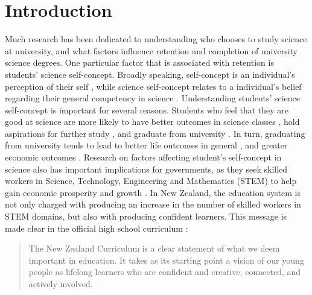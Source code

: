 \section{Introduction}
\label{intro}
Much research has been dedicated to understanding who chooses to study science at university, and what factors influence retention and completion of university science degrees. One particular factor that is associated with retention is students' science self-concept. Broadly speaking, self-concept is an individual's perception of their self \citep{shavelson1976self}, while science self-concept relates to a individual's belief regarding their general competency in science \citep{jansen2015students}. Understanding students' science self-concept is important for several reasons. Students who feel that they are good at science are more likely to have better outcomes in science classes \citep{uccar2017role,tighezza2014modeling,chang2008science,peters2013examining}, hold aspirations for further study \citep{mujtaba2018students}, and graduate from university \citep{larson2015predicting}. In turn, graduating from university tends to lead to better life outcomes in general \citep{Oreopoulos_2007}, and greater economic outcomes \citep{norton2016mapping,mahoney2013moving}. Research on factors affecting student's self-concept in science also has important implications for governments, as they seek skilled workers in Science, Technology, Engineering and Mathematics (STEM) to help gain economic prosperity and growth \citep{pricewaterhousecoopers2015smart}. In New Zealand, the education system is not only charged with producing an increase in the number of skilled workers in STEM domains, but also with producing confident learners. This message is made clear in the official high school curriculum \citep{NZC}:

\begin{quote}
   The New Zealand Curriculum is a clear statement of what we deem important in education. It takes as its starting point a vision of our young people as lifelong learners who are confident and creative, connected, and actively involved.
\end{quote} 

